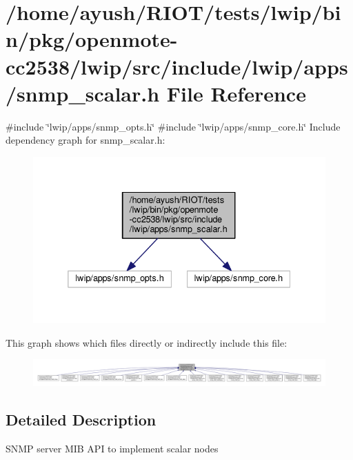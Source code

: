 \hypertarget{openmote-cc2538_2lwip_2src_2include_2lwip_2apps_2snmp__scalar_8h}{}\section{/home/ayush/\+R\+I\+O\+T/tests/lwip/bin/pkg/openmote-\/cc2538/lwip/src/include/lwip/apps/snmp\+\_\+scalar.h File Reference}
\label{openmote-cc2538_2lwip_2src_2include_2lwip_2apps_2snmp__scalar_8h}
{\ttfamily \#include \char`\"{}lwip/apps/snmp\+\_\+opts.\+h\char`\"{}}\newline
{\ttfamily \#include \char`\"{}lwip/apps/snmp\+\_\+core.\+h\char`\"{}}\newline
Include dependency graph for snmp\+\_\+scalar.\+h\+:
\nopagebreak
\begin{figure}[H]
\begin{center}
\leavevmode
\includegraphics[width=332pt]{openmote-cc2538_2lwip_2src_2include_2lwip_2apps_2snmp__scalar_8h__incl}
\end{center}
\end{figure}
This graph shows which files directly or indirectly include this file\+:
\nopagebreak
\begin{figure}[H]
\begin{center}
\leavevmode
\includegraphics[width=350pt]{openmote-cc2538_2lwip_2src_2include_2lwip_2apps_2snmp__scalar_8h__dep__incl}
\end{center}
\end{figure}


\subsection{Detailed Description}
S\+N\+MP server M\+IB A\+PI to implement scalar nodes 
